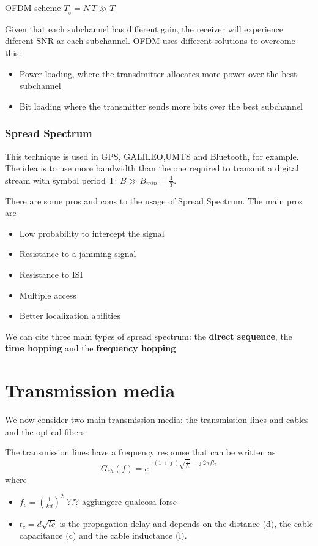 OFDM scheme
$T_{_0}=N\,T \gg T$

Given that each subchannel has different gain, the receiver will experience diferent SNR ar each subchannel. OFDM uses different solutions to overcome this:
\begin{itemize}
  \item Power loading, where the transdmitter allocates more power over the best subchannel
  \item Bit loading where the transmitter sends more bits over the best subchannel
\end{itemize}

\subsubsection{Spread Spectrum}
This technique is used in GPS, GALILEO,UMTS and Bluetooth, for example. The idea is to use more bandwidth than the one required to transmit a digital stream with symbol period T: $B \gg B_{min}=\frac{1}{T}$.

There are some pros and cons to the usage of Spread Spectrum. The main pros are
\begin{itemize}
  \item Low probability to intercept the signal
  \item Resistance to a jamming signal
  \item Resistance to ISI
  \item Multiple access
  \item Better localization abilities
\end{itemize}
We can cite three main types of spread spectrum: the \textbf{direct sequence}, the \textbf{time hopping} and the \textbf{frequency hopping}

\section{Transmission media}
We now consider two main transmission media: the transmission lines and cables and the optical fibers.

The transmission lines have a frequency response that can be written as
\begin{equation}
  G_{ch}(f) = e^{-(1+\jmath)\sqrt{\frac{f}{f_c}} - \jmath 2 \pi f t_c}
\end{equation}
where
\begin{itemize}
  \item $f_c = \left(\frac{1}{kd}\right)^2$  ??? aggiungere qualcosa forse
  \item $t_c = d \sqrt{l c}$ is the propagation delay and depends on the distance (d), the cable capacitance (c) and the cable inductance (l).
\end{itemize}

